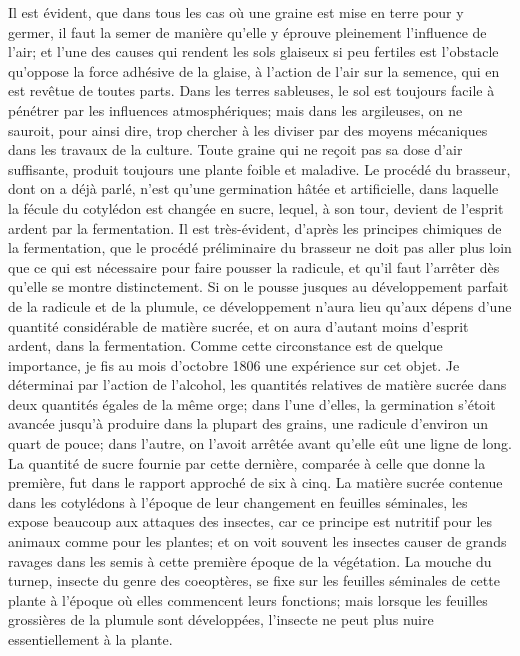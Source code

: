 Il est évident, que dans tous les cas où une graine est mise en terre pour y germer, il faut la semer de manière qu'elle y éprouve pleinement l'influence de l'air; et l'une des causes qui rendent les sols glaiseux si peu fertiles est l'obstacle qu'oppose la force adhésive de la glaise, à l'action de l'air sur la semence, qui en est revêtue de toutes parts.
Dans les terres sableuses, le sol est toujours facile à pénétrer par les influences atmosphériques; mais dans les argileuses, on ne sauroit, pour ainsi dire, trop chercher à les diviser par des moyens mécaniques dans les travaux de la culture. Toute graine qui ne reçoit pas sa dose d'air suffisante, produit toujours une plante foible et maladive.
Le procédé du brasseur, dont on a déjà parlé,\setcounter{page}{17} n'est qu'une germination hâtée et artificielle, dans laquelle la fécule du cotylédon est changée en sucre, lequel, à son tour, devient de l'esprit ardent par la fermentation.
Il est très-évident, d'après les principes chimiques de la fermentation, que le procédé préliminaire du brasseur ne doit pas aller plus loin que ce qui est nécessaire pour faire pousser la radicule, et qu'il faut l'arrêter dès qu'elle se montre distinctement. Si on le pousse jusques au développement parfait de la radicule et de la plumule, ce développement n'aura lieu qu'aux dépens d'une quantité considérable de matière sucrée, et on aura d'autant moins d'esprit ardent, dans la fermentation.
Comme cette circonstance est de quelque importance, je fis au mois d'octobre 1806 une expérience sur cet objet. Je déterminai par l'action de l'alcohol, les quantités relatives de matière sucrée dans deux quantités égales de la même orge; dans l'une d'elles, la germination s'étoit avancée jusqu'à produire dans la plupart des grains, une radicule d'environ un quart de pouce; dans l'autre, on l'avoit arrêtée avant qu'elle eût une ligne de long. La quantité de sucre fournie par cette dernière, comparée à celle que\setcounter{page}{18} donne la première, fut dans le rapport approché de six à cinq.
La matière sucrée contenue dans les cotylédons à l'époque de leur changement en feuilles séminales, les expose beaucoup aux attaques des insectes, car ce principe est nutritif pour les animaux comme pour les plantes; et on voit souvent les insectes causer de grands ravages dans les semis à cette première époque de la végétation.
La mouche du turnep, insecte du genre des coeoptères, se fixe sur les feuilles séminales de cette plante à l'époque où elles commencent leurs fonctions; mais lorsque les feuilles grossières de la plumule sont développées, l'insecte ne peut plus nuire essentiellement à la plante.
